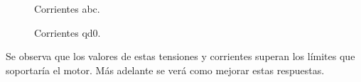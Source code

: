 \documentclass[a4paper, 10pt, onecolumn,journal]{ieeeconf}
\begin{document}
\begin{figure}[H]
	\centering
	\begin{adjustbox}{max width=\columnwidth}
	\end{adjustbox}
	\caption{Corrientes abc.}
	\label{Corrientes abc}
\end{figure}

\begin{figure}[H]
	\centering
	\begin{adjustbox}{max width=\columnwidth}
	\end{adjustbox}
	\caption{Corrientes qd0.}
	\label{Corrientes qd0}
\end{figure}
Se observa que los valores de estas tensiones y corrientes superan los límites que soportaría el motor. Más adelante se verá como mejorar estas respuestas.
\end{document}
